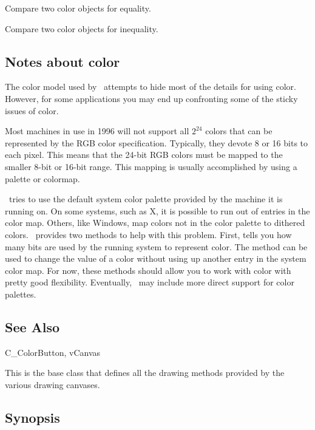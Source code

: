 
Compare two color objects for equality.


Compare two color objects for inequality.

\subsection* {Notes about color}

The color model used by \V\ attempts to hide most of the
details for using color. However, for some applications
you may end up confronting some of the sticky issues of
color.

Most machines in use in 1996 will not support all $2^{24}$
colors that can be represented by the RGB color specification.
Typically, they devote 8 or 16 bits to each pixel. This
means that the 24-bit RGB colors must be mapped to the
smaller 8-bit or 16-bit range. This mapping is usually
accomplished by using a palette or colormap.

\V\ tries to use the default system color palette provided by the
machine it is running on. On some systems, such as X, it is
possible to run out of entries in the color map. Others, like
Windows, map colors not in the color palette to dithered colors.
\V\ provides two methods to help with this problem. First,
 tells you how many bits are used by
the running system to represent color. The method  
 can be used to change the value
of a color without using up another entry in the system color
map. For now, these methods should allow you to work with color
with pretty good flexibility. Eventually, \V\ may include more
direct support for color palettes.


\subsection* {See Also}

C\_ColorButton, vCanvas




This is the base class that defines all the drawing methods provided
by the various drawing canvases.

\subsection* {Synopsis}

